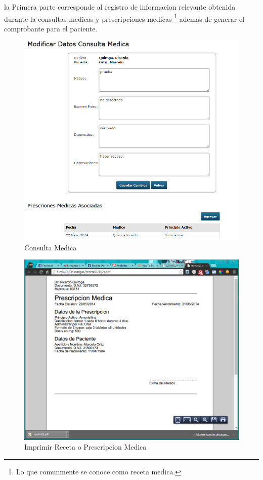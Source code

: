 la Primera parte corresponde al registro de informacion relevante obtenida durante
la consultas medicas y prescripciones medicas \footnote{Lo que comunmente se 
conoce como receta medica.} ademas de generar el comprobante para el paciente.

\begin{figure}[H]
    \centering
    \includegraphics[scale=0.5]{resourse/consulta-medica.png}
    \caption{Consulta Medica}
    \label{fig:616}
\end{figure}

\begin{figure}[H]
    \centering
    \includegraphics[scale=0.3]{resourse/receta.png}
    \caption{Imprimir Receta o Prescripcion Medica}
    \label{fig:617}
\end{figure}

